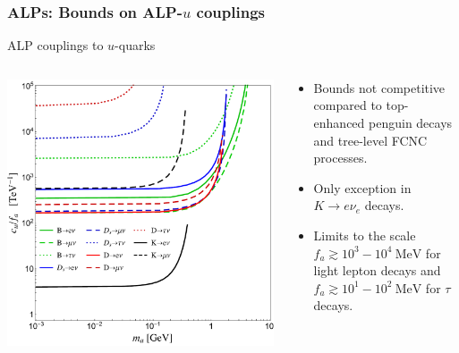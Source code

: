\documentclass[mathserif, 10pt, dvipsnames]{beamer}
\begin{document}
\begin{frame}\frametitle{ALPs: Bounds on ALP-$u$ couplings}
    ALP couplings to $u$-quarks
    \begin{columns}
        \begin{column}{0.5\textwidth}
            \includegraphics[width=\columnwidth]{figures/Fig2aS}
        \end{column}
        \begin{column}{0.5\textwidth}
            \begin{itemize}
                \item Bounds not competitive compared to top-enhanced penguin decays and tree-level FCNC processes.
                \item Only exception in $K\to e \nu_e$ decays.
                \item Limits to the scale $f_a \gtrsim 10^3- 10^4~\mathrm{MeV}$ for light lepton decays and $f_a \gtrsim 10^1 - 10^2~\mathrm{MeV}$ for $\tau$ decays.
            \end{itemize}
        \end{column}
    \end{columns}
\end{frame}
\end{document}
